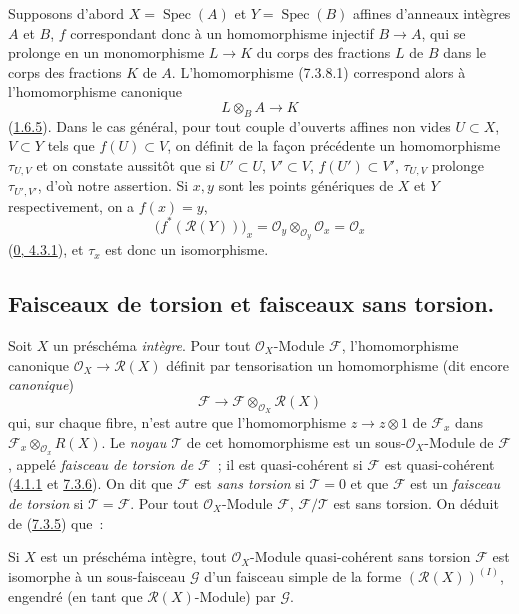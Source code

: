 Supposons d'abord $X=\operatorname{Spec}(A)$ et $Y=\operatorname{Spec}(B)$ affines d'anneaux
intègres $A$ et $B$, $f$ correspondant donc à un homomorphisme injectif
$B\to A$, qui se prolonge en un monomorphisme $L\to K$ du corps des
fractions $L$ de $B$ dans le corps des fractions $K$ de $A$.
L'homomorphisme (7.3.8.1) correspond alors à l'homomorphisme canonique
\[
  L\otimes_B A\to K
\]
(\hyperref[I.1.6.5-fr]{1.6.5}). Dans le cas général, pour tout couple d'ouverts affines non
vides $U\subset X$, $V\subset Y$ tels que $f(U)\subset V$, on définit
de la façon précédente un homomorphisme $\tau_{U,V}$ et on constate
aussitôt que si $U'\subset U$, $V'\subset V$,
$f(U')\subset V'$, $\tau_{U,V}$ prolonge $\tau_{U',V'}$, d'où notre
assertion. Si $x,y$ sont les points génériques de $X$ et $Y$
respectivement, on a $f(x)=y$,
\[
  \bigl(f^*(\mathscr{R}(Y))\bigr)_x
  =\mathscr{O}_y\otimes_{\mathscr{O}_y}\mathscr{O}_x
  =\mathscr{O}_x
\]
(\hyperref[0.4.3.1-fr]{0, 4.3.1}), et $\tau_x$ est donc un isomorphisme.

\subsection{Faisceaux de torsion et faisceaux sans torsion.}
\label{subsection:I.7.4-fr}

\begin{env}[7.4.1]
\label{I.7.4.1-fr}
Soit $X$ un préschéma \emph{intègre}. Pour tout $\mathscr{O}_X$-Module
$\mathscr{F}$, l'homomorphisme canonique
$\mathscr{O}_X\to\mathscr{R}(X)$ définit par tensorisation un homomorphisme
(dit encore \emph{canonique})
\[
  \mathscr{F}\to
  \mathscr{F}\otimes_{\mathscr{O}_X}\mathscr{R}(X)
\]
qui, sur chaque fibre, n'est autre que l'homomorphisme $z\to z\otimes 1$ de
$\mathscr{F}_x$ dans
$\mathscr{F}_x\otimes_{\mathscr{O}_x}R(X)$. Le \emph{noyau $\mathscr{T}$}
de cet homomorphisme est un sous-$\mathscr{O}_X$-Module de $\mathscr{F}$,
appelé \emph{faisceau de torsion de $\mathscr{F}$}~; il est quasi-cohérent si
$\mathscr{F}$ est quasi-cohérent
(\hyperref[I.4.1.1-fr]{4.1.1} et \hyperref[I.7.3.6-fr]{7.3.6}). On dit que
$\mathscr{F}$ est \emph{sans torsion} si $\mathscr{T}=0$ et que
$\mathscr{F}$ est un \emph{faisceau de torsion} si
$\mathscr{T}=\mathscr{F}$. Pour tout $\mathscr{O}_X$-Module $\mathscr{F}$,
$\mathscr{F}/\mathscr{T}$ est sans torsion. On déduit de
(\hyperref[I.7.3.5-fr]{7.3.5}) que~:
\end{env}

\begin{proposition}[7.4.2]
\label{I.7.4.2-fr}
Si $X$ est un préschéma intègre, tout $\mathscr{O}_X$-Module quasi-cohérent
sans torsion $\mathscr{F}$ est isomorphe à un sous-faisceau $\mathscr{G}$
d'un faisceau simple de la forme $(\mathscr{R}(X))^{(I)}$, engendré (en tant
que $\mathscr{R}(X)$-Module) par $\mathscr{G}$.
\end{proposition}

